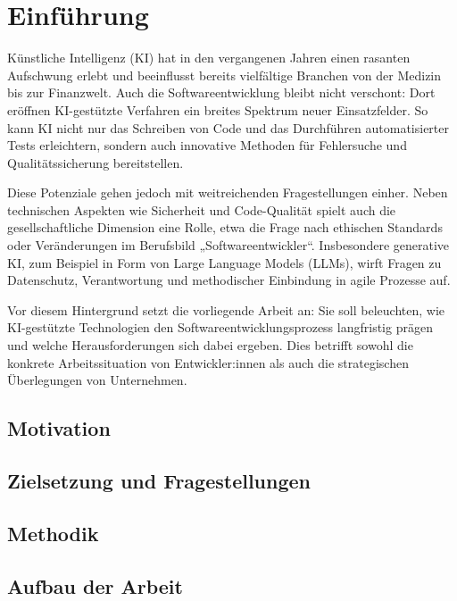 \chapter{Einführung}
Künstliche Intelligenz (KI) hat in den vergangenen Jahren einen rasanten Aufschwung erlebt und beeinflusst bereits vielfältige Branchen von der Medizin bis zur Finanzwelt. Auch die Softwareentwicklung bleibt nicht verschont: Dort eröffnen KI-gestützte Verfahren ein breites Spektrum neuer Einsatzfelder. So kann KI nicht nur das Schreiben von Code und das Durchführen automatisierter Tests erleichtern, sondern auch innovative Methoden für Fehlersuche und Qualitätssicherung bereitstellen.

Diese Potenziale gehen jedoch mit weitreichenden Fragestellungen einher. Neben technischen Aspekten wie Sicherheit und Code-Qualität spielt auch die gesellschaftliche Dimension eine Rolle, etwa die Frage nach ethischen Standards oder Veränderungen im Berufsbild „Softwareentwickler“. Insbesondere generative KI, zum Beispiel in Form von Large Language Models (LLMs), wirft Fragen zu Datenschutz, Verantwortung und methodischer Einbindung in agile Prozesse auf.

Vor diesem Hintergrund setzt die vorliegende Arbeit an: Sie soll beleuchten, wie KI-gestützte Technologien den Softwareentwicklungsprozess langfristig prägen und welche Herausforderungen sich dabei ergeben. Dies betrifft sowohl die konkrete Arbeitssituation von Entwickler:innen als auch die strategischen Überlegungen von Unternehmen.

\section{Motivation}


\section{Zielsetzung und Fragestellungen}


\section{Methodik}


\section{Aufbau der Arbeit}


